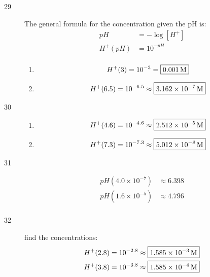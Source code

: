 \documentclass{exam}
\begin{document}
\begin{description}
      \item[29]
        The general formula for the concentration given the pH is:
        \begin{align*}
          pH      & = - \log[H^+] \\
          H^+(pH) & = 10^{-pH} \\
        \end{align*}

        \begin{enumerate}[a]
          \item 
            \[
              H^+(3) = 10^{-3} = \boxed{\unit[0.001]{M}} \\
            \]

          \item 
            \[
              H^+(6.5) = 10^{-6.5} \approx \boxed{\unit[3.162 \times 10^{-7}]{M}} \\
            \]

        \end{enumerate}

      \item[30]
        \begin{enumerate}[a]
          \item 
            \[
              H^+(4.6) = 10^{-4.6} \approx \boxed{\unit[2.512 \times 10^{-5}]{M}} \\
            \]

          \item 
            \[
              H^+(7.3) = 10^{-7.3} \approx \boxed{\unit[5.012 \times 10^{-8}]{M}} \\
            \]

        \end{enumerate}

      \item[31]
        \begin{align*}
          pH(4.0 \times 10^{-7}) & \approx \boxed{6.398} \\
          pH(1.6 \times 10^{-5}) & \approx \boxed{4.796} \\
        \end{align*}

      \item[32]
        find the concentrations:
        \begin{align*}
          H^+(2.8) &= 10^{-2.8} \approx \boxed{\unit[1.585 \times 10^{-3}]{M}} \\
          H^+(3.8) &= 10^{-3.8} \approx \boxed{\unit[1.585 \times 10^{-4}]{M}} \\
        \end{align*}


\end{description}
\end{document}
